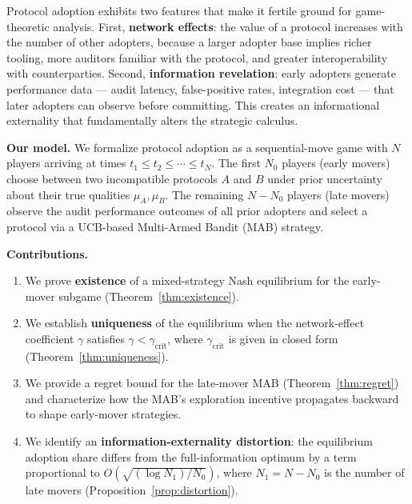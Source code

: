 \documentclass[12pt,a4paper]{article}
\begin{document}
Protocol adoption exhibits two features that make it fertile ground for
game-theoretic analysis.  First, \textbf{network effects}: the value of a
protocol increases with the number of other adopters, because a larger
adopter base implies richer tooling, more auditors familiar with the
protocol, and greater interoperability with counterparties.
Second, \textbf{information revelation}: early adopters generate performance
data --- audit latency, false-positive rates, integration cost --- that later
adopters can observe before committing.  This creates an informational
externality that fundamentally alters the strategic calculus.

\medskip\noindent
\textbf{Our model.}
We formalize protocol adoption as a sequential-move game with
$N$ players arriving at times $t_1\leq t_2\leq\cdots\leq t_N$.
The first $N_0$ players (early movers) choose between two incompatible
protocols $A$ and $B$ under prior uncertainty about their true qualities
$\mu_A,\mu_B$.  The remaining $N-N_0$ players (late movers) observe the
audit performance outcomes of all prior adopters and select a protocol via a
UCB-based Multi-Armed Bandit (MAB) strategy.

\medskip\noindent
\textbf{Contributions.}
\begin{enumerate}[label=(\arabic*)]
    \item We prove \textbf{existence} of a mixed-strategy Nash equilibrium
          for the early-mover subgame (Theorem~\ref{thm:existence}).
    \item We establish \textbf{uniqueness} of the equilibrium when the
          network-effect coefficient $\gamma$ satisfies
          $\gamma<\gamma_{\text{crit}}$, where $\gamma_{\text{crit}}$ is
          given in closed form (Theorem~\ref{thm:uniqueness}).
    \item We provide a regret bound for the late-mover MAB
          (Theorem~\ref{thm:regret}) and characterize how the MAB's
          exploration incentive propagates backward to shape early-mover
          strategies.
    \item We identify an \textbf{information-externality distortion}: the
          equilibrium adoption share differs from the full-information
          optimum by a term proportional to
          $O(\sqrt{(\log N_1)/N_0})$, where $N_1=N-N_0$ is the number of
          late movers (Proposition~\ref{prop:distortion}).
\end{enumerate}

\end{document}
